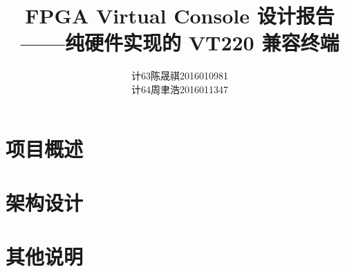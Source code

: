 \documentclass[fontset=fandol]{ctexart}
\newcommand{\arttitle}{FPGA Virtual Console 设计报告}
\newcommand{\artsubject}{纯硬件实现的 VT220 兼容终端}
\begin{document}
\title{{\bf\arttitle\\——\artsubject}}
\author{
计63\hspace{1em}陈晟祺\hspace{1em}2016010981 \\
计64\hspace{1em}周聿浩\hspace{1em}2016011347
}
\date{}
\maketitle

\tableofcontents

\section{项目概述}



\section{架构设计}





\section{其他说明}


\end{document}
